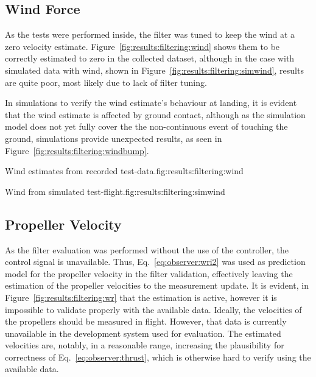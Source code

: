 \subsection{Wind Force}
    As the tests were performed inside, the filter was tuned to keep the
    wind at a zero velocity estimate.
    Figure~\ref{fig:results:filtering:wind} shows them to be correctly estimated to zero in the collected dataset,
    although in the case with simulated data with wind, shown in Figure~\ref{fig:results:filtering:simwind},
    results are quite poor, most likely due to lack of filter tuning.

    In simulations to verify the wind estimate's behaviour at landing, it
    is evident that the wind estimate is affected by ground contact,
    although as the simulation model does not yet fully cover the the non-continuous
    event of touching the ground, simulations provide unexpected results, as seen in
    Figure~\ref{fig:results:filtering:windbump}.

    \begin{subfigures}{Wind estimates from recorded test-data.}{fig:results:filtering:wind}
    \end{subfigures}

    \begin{subfigures}{Wind from simulated test-flight.}{fig:results:filtering:simwind}
    \end{subfigures}


\subsection{Propeller Velocity}
    As the filter evaluation was performed without the use of the controller,
    the control signal is unavailable. Thus, Eq.~\ref{eq:observer:wri2} was used as
    prediction model for the propeller velocity in the filter validation, effectively leaving the estimation of the propeller velocities
    to the measurement update. It is evident, in Figure~\ref{fig:results:filtering:wr}
    that the estimation is active, however it is impossible to validate properly with the available data.
    Ideally, the velocities of the propellers should be measured in flight.
    However, that data is currently unavailable in the development system used for evaluation.
    The estimated velocities are, notably, in a reasonable range,
    increasing the plausibility for correctness of Eq.~\ref{eq:observer:thrust}, which is
    otherwise hard to verify using the available data.

